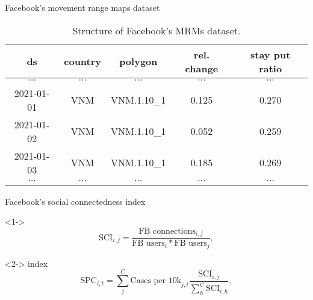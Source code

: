 \begin{frame}{Facebook's movement range maps dataset}
    \begin{table}[h]
    \centering
    \begin{tabular}{| c | c | c | c | c |}
        ds & country & polygon & rel. change & stay put ratio \\
        \hline\hline
        $\cdots$ & $\cdots$ & $\cdots$ & $\cdots$ & $\cdots$ \\
        \hline
        2021-01-01 & VNM & VNM.1.10\_1 & 0.125 & 0.270 \\
        \hline
        2021-01-02 & VNM & VNM.1.10\_1 & 0.052 & 0.259 \\
        \hline
        2021-01-03 & VNM & VNM.1.10\_1 & 0.185 & 0.269 \\
        \hline
        $\cdots$ & $\cdots$ & $\cdots$ & $\cdots$ & $\cdots$ \\
    \end{tabular}
    \caption{Structure of Facebook's \glspl{MRM} dataset.}
    \label{tab:facebook-movement-range-maps}
    \end{table}
\end{frame}

\begin{frame}{Facebook's social connectedness index}
    \begin{block}<1->{}
        \begin{equation*}
            \text{SCI}_{i,j} = \frac{\text{FB connections}_{i,j}}{\text{FB users}_i * \text{FB users}_j},
        \end{equation*}
    \end{block}

    \begin{block}<2->{ index \cite{kuchlerGeographicSpreadCOVID192020}}
        \begin{equation*}
            \text{SPC}_{i,t} = \sum_j^C \text{Cases per 10k}_{j,t} \frac{\text{SCI}_{i,j}}{\sum_h^C \text{SCI}_{i,h}},
        \end{equation*}
    \end{block}
\end{frame}

